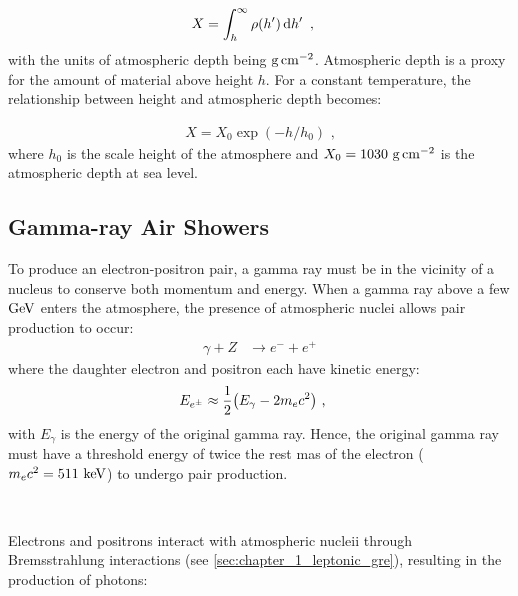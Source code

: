 \begin{equation}
    \begin{aligned}
    X&=\int_{h}^\infty \rho\qty(h')\dd{h'}\text{ ,}
    \end{aligned}
\end{equation}
\noindent with the units of atmospheric depth being $\si{\gram\per\centi\meter\squared}$. Atmospheric depth is a proxy for the amount of material above height $h$. For a constant temperature, the relationship between height and atmospheric depth becomes:

\begin{equation}
    \begin{aligned}
    X=X_0\exp(-h/h_0)\text{ ,}
    \end{aligned}
\end{equation}
where $h_0$ is the scale height of the atmosphere and $X_0=1030~\si{\gram\per\centi\meter\squared}$ is the atmospheric depth at sea level. 
\subsection{Gamma-ray Air Showers} \label{sec:05_air_shower_gamma_ray}
To produce an electron-positron pair, a gamma ray must be in the vicinity of a nucleus to conserve both momentum and energy. When a gamma ray above a few $\si{\giga\electronvolt}$ enters the atmosphere, the presence of atmospheric nuclei allows pair production to occur:
\begin{equation}
    \begin{aligned}
    \gamma + Z &\rightarrow e^- + e^+
    \end{aligned}
\end{equation}
\noindent where the daughter electron and positron each have kinetic energy:
\begin{equation}
    \begin{aligned}
    E_{e^\pm}&\approx \frac{1}{2}\qty(E_\gamma-2m_ec^2)\text{ ,}
    \end{aligned} \label{eq:05_gamma_astrom_pair_condition}
\end{equation}
\noindent with $E_\gamma$ is the energy of the original gamma ray. Hence, the original gamma ray must have a threshold energy of twice the rest mas of the electron ($m_ec^2=511~\si{\kilo\electronvolt}$) to undergo pair production.
\par~\par
Electrons and positrons interact with atmospheric nucleii through Bremsstrahlung interactions (see \autoref{sec:chapter_1_leptonic_gre}), resulting in the production of photons:

